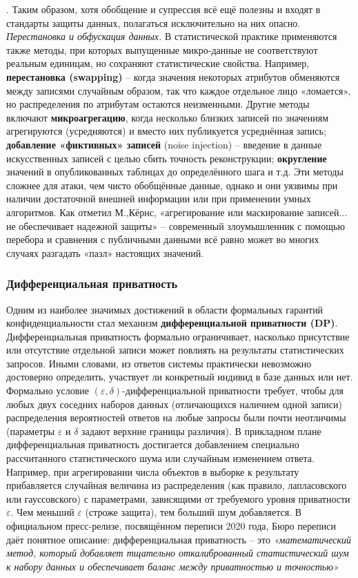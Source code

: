 \autocite{blog-seas-upenn-edu}
. Таким образом, хотя обобщение и супрессия всё ещё полезны и входят в стандарты защиты данных, полагаться исключительно на них опасно. \textit{Перестановка и обфускация данных.} В статистической практике применяются также методы, при которых выпущенные микро-данные не соответствуют реальным единицам, но сохраняют статистические свойства. Например, \textbf{перестановка (swapping)} – когда значения некоторых атрибутов обменяются между записями случайным образом, так что каждое отдельное лицо «ломается», но распределения по атрибутам остаются неизменными. Другие методы включают \textbf{микроагрегацию}, когда несколько близких записей по значениям агрегируются (усредняются) и вместо них публикуется усреднённая запись; \textbf{добавление «фиктивных» записей} (noise injection) – введение в данные искусственных записей с целью сбить точность реконструкции; \textbf{округление} значений в опубликованных таблицах до определённого шага и т.д. Эти методы сложнее для атаки, чем чисто обобщённые данные, однако и они уязвимы при наличии достаточной внешней информации или при применении умных алгоритмов. Как отметил М.,Кёрнс, «агрегирование или маскирование записей... не обеспечивает надежной защиты»
\autocite{blog-seas-upenn-edu}
 – современный злоумышленник с помощью перебора и сравнения с публичными данными всё равно может во многих случаях разгадать «пазл» настоящих значений. \subsubsection{Дифференциальная приватность} \label{sec:dp}
Одним из наиболее значимых достижений в области формальных гарантий конфиденциальности стал механизм \textbf{дифференциальной приватности (DP)}. Дифференциальная приватность формально ограничивает, насколько присутствие или отсутствие отдельной записи может повлиять на результаты статистических запросов. Иными словами, из ответов системы практически невозможно достоверно определить, участвует ли конкретный индивид в базе данных или нет. Формально условие $(\varepsilon,\delta)$-дифференциальной приватности требует, чтобы для любых двух соседних наборов данных (отличающихся наличием одной записи) распределения вероятностей ответов на любые запросы были почти неотличимы (параметры $\varepsilon$ и $\delta$ задают верхние границы различия). В прикладном плане дифференциальная приватность достигается добавлением специально рассчитанного статистического шума или случайным изменением ответа. Например, при агрегировании числа объектов в выборке к результату прибавляется случайная величина из распределения (как правило, лапласовского или гауссовского) с параметрами, зависящими от требуемого уровня приватности $\varepsilon$. Чем меньший $\varepsilon$ (строже защита), тем больший шум добавляется. В официальном пресс-релизе, посвящённом переписи 2020 года, Бюро переписи даёт понятное описание: дифференциальная приватность – это \textit{«математический метод, который добавляет тщательно откалиброванный статистический шум к набору данных и обеспечивает баланс между приватностью и точностью»}
